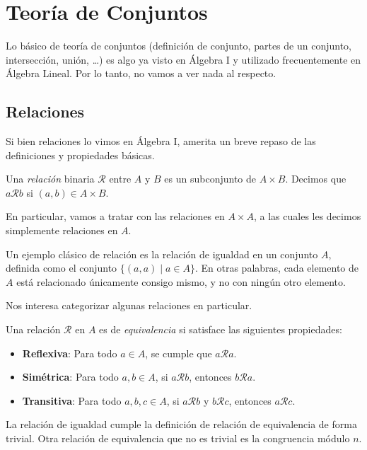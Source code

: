 \section{Teoría de Conjuntos}

Lo básico de teoría de conjuntos (definición de conjunto, partes de un conjunto, intersección, unión, \dots) es algo ya visto en Álgebra I y utilizado frecuentemente en Álgebra Lineal. Por lo tanto, no vamos a ver nada al respecto.  

\subsection{Relaciones}

Si bien relaciones lo vimos en Álgebra I, amerita un breve repaso de las definiciones y propiedades básicas.

\begin{definition}
    Una \emph{relación} binaria $\mathcal{R}$ entre $A$ y $B$ es un subconjunto de $A \times B$. Decimos que $a \mathcal{R} b$ si $(a, b) \in A \times B$.
\end{definition}

En particular, vamos a tratar con las relaciones en $A \times A$, a las cuales les decimos simplemente relaciones en $A$.

Un ejemplo clásico de relación es la relación de igualdad en un conjunto $A$, definida como el conjunto $\{(a, a) \mid a \in A\}$. En otras palabras, cada elemento de $A$ está relacionado únicamente consigo mismo, y no con ningún otro elemento.

Nos interesa categorizar algunas relaciones en particular. 

\begin{definition}
    Una relación $\mathcal{R}$ en $A$ es de \emph{equivalencia} si satisface las siguientes propiedades:
    \begin{itemize}
        \item \textbf{Reflexiva}: Para todo $a \in A$, se cumple que $a \mathcal{R} a$.
        \item \textbf{Simétrica}: Para todo $a, b \in A$, si $a \mathcal{R} b$, entonces $b \mathcal{R} a$.
        \item \textbf{Transitiva}: Para todo $a, b, c \in A$, si $a \mathcal{R} b$ y $b \mathcal{R} c$, entonces $a \mathcal{R} c$.
    \end{itemize}
\end{definition}

La relación de igualdad cumple la definición de relación de equivalencia de forma trivial. Otra relación de equivalencia que no es trivial es la congruencia módulo $n$.

